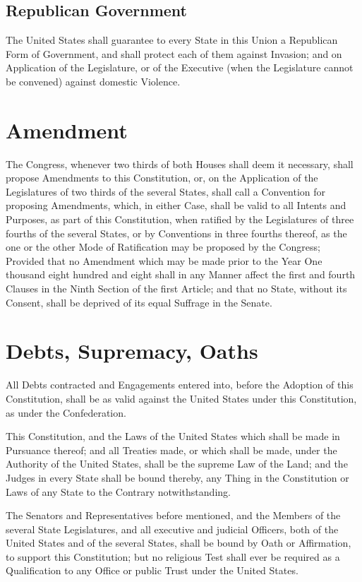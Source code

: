 \documentclass{constitution}
\begin{document}
\section{Republican Government}
The United States shall guarantee to every State in this Union
a Republican Form of Government,
and shall protect each of them against Invasion;
and on Application of the Legislature,
or of the Executive (when the Legislature cannot be convened)
against domestic Violence.

\chapter{Amendment}
The Congress, whenever two thirds of both Houses shall deem it necessary,
shall propose Amendments to this Constitution,
or, on the Application of the Legislatures of two thirds of the several States,
shall call a Convention for proposing Amendments,
which, in either Case, shall be valid to all Intents and Purposes, as part of this Constitution,
when ratified by the Legislatures of three fourths of the several States,
or by Conventions in three fourths thereof,
as the one or the other Mode of Ratification may be proposed by the Congress;
Provided that no Amendment which may be made
prior to the Year One thousand eight hundred and eight
shall in any Manner affect the first and fourth Clauses in the Ninth Section of the first Article;
and that no State, without its Consent, shall be deprived of its equal Suffrage in the Senate.

\chapter{Debts, Supremacy, Oaths}
All Debts contracted and Engagements entered into, before the Adoption of this Constitution,
shall be as valid against the United States under this Constitution, as under the Confederation.

This Constitution, and the Laws of the United States which shall be made in Pursuance thereof;
and all Treaties made, or which shall be made, under the Authority of the United States,
shall be the supreme Law of the Land;
and the Judges in every State shall be bound thereby,
any Thing in the Constitution or Laws of any State to the Contrary notwithstanding.

The Senators and Representatives before mentioned,
and the Members of the several State Legislatures,
and all executive and judicial Officers, both of the United States and of the several States,
shall be bound by Oath or Affirmation, to support this Constitution;
but no religious Test shall ever be required as a Qualification to any Office or public Trust under the United States.
\end{document}
